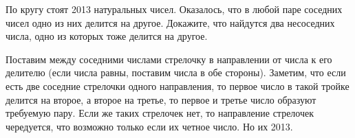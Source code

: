 \problem
По кругу стоят 2013 натуральных чисел.
Оказалось, что в любой паре соседних чисел одно из них делится на другое.
Докажите, что найдутся два несоседних числа, одно из которых тоже делится на
другое.

\solution
Поставим между соседними числами стрелочку в направлении от числа к его
делителю (если числа равны, поставим числа в обе стороны).
Заметим, что если есть две соседние стрелочки одного направления, то первое
число в такой тройке делится на второе, а второе на третье, то первое и третье
число образуют требуемую пару.
Если же таких стрелочек нет, то направление стрелочек чередуется, что возможно
только если их четное число.
Но их 2013.
\endproblem
